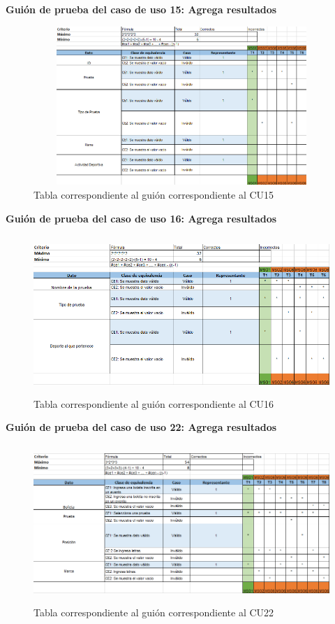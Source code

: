 	\textbf{Guión de prueba del caso de uso 15: Agrega resultados}
	\begin{figure}[hbt!]
		\centering
		\includegraphics[width=14cm, height=6cm]{Imagenes/Pruebas/GuionPruebaCU15}
		\caption{Tabla correspondiente al guión correspondiente al CU15}
		\label{guionpruebaCU15}
	\end{figure}
\pagebreak
	
	\textbf{Guión de prueba del caso de uso 16: Agrega resultados}	
	\begin{figure}[hbt!]
		\centering
		\includegraphics[width=14cm, height=6cm]{Imagenes/Pruebas/GuionPruebaCU16}
		\caption{Tabla correspondiente al guión correspondiente al CU16}
		\label{guionpruebaCU16}
	\end{figure}
	
	\textbf{Guión de prueba del caso de uso 22: Agrega resultados}	
	\begin{figure}[hbt!]
		\centering
		\includegraphics[width=14cm, height=6cm]{Imagenes/Pruebas/GuionPruebaCU22}
		\caption{Tabla correspondiente al guión correspondiente al CU22}
		\label{guionpruebaCU22}
	\end{figure}
	
	
	